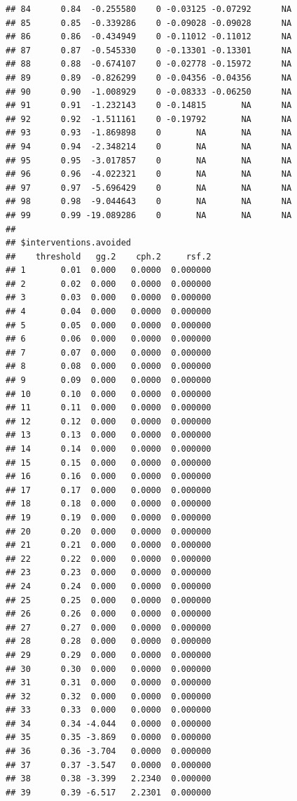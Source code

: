 \documentclass{article}\usepackage[]{graphicx}\usepackage[]{color}
\makeatletter
\newenvironment{kframe}{%
 \def\at@end@of@kframe{}%
 \ifinner\ifhmode%
  \def\at@end@of@kframe{\end{minipage}}%
  \begin{minipage}{\columnwidth}%
 \fi\fi%
 \def\FrameCommand##1{\hskip\@totalleftmargin \hskip-\fboxsep
 \colorbox{shadecolor}{##1}\hskip-\fboxsep
     \hskip-\linewidth \hskip-\@totalleftmargin \hskip\columnwidth}%
 \MakeFramed {\advance\hsize-\width
   \@totalleftmargin\z@ \linewidth\hsize
   \@setminipage}}%
 {\par\unskip\endMakeFramed%
 \at@end@of@kframe}
\newenvironment{knitrout}{}{} %
\makeatother
\begin{document}
\begin{knitrout}
\begin{kframe}
\begin{verbatim}
## 84      0.84  -0.255580    0 -0.03125 -0.07292      NA
## 85      0.85  -0.339286    0 -0.09028 -0.09028      NA
## 86      0.86  -0.434949    0 -0.11012 -0.11012      NA
## 87      0.87  -0.545330    0 -0.13301 -0.13301      NA
## 88      0.88  -0.674107    0 -0.02778 -0.15972      NA
## 89      0.89  -0.826299    0 -0.04356 -0.04356      NA
## 90      0.90  -1.008929    0 -0.08333 -0.06250      NA
## 91      0.91  -1.232143    0 -0.14815       NA      NA
## 92      0.92  -1.511161    0 -0.19792       NA      NA
## 93      0.93  -1.869898    0       NA       NA      NA
## 94      0.94  -2.348214    0       NA       NA      NA
## 95      0.95  -3.017857    0       NA       NA      NA
## 96      0.96  -4.022321    0       NA       NA      NA
## 97      0.97  -5.696429    0       NA       NA      NA
## 98      0.98  -9.044643    0       NA       NA      NA
## 99      0.99 -19.089286    0       NA       NA      NA
## 
## $interventions.avoided
##    threshold   gg.2    cph.2     rsf.2
## 1       0.01  0.000   0.0000  0.000000
## 2       0.02  0.000   0.0000  0.000000
## 3       0.03  0.000   0.0000  0.000000
## 4       0.04  0.000   0.0000  0.000000
## 5       0.05  0.000   0.0000  0.000000
## 6       0.06  0.000   0.0000  0.000000
## 7       0.07  0.000   0.0000  0.000000
## 8       0.08  0.000   0.0000  0.000000
## 9       0.09  0.000   0.0000  0.000000
## 10      0.10  0.000   0.0000  0.000000
## 11      0.11  0.000   0.0000  0.000000
## 12      0.12  0.000   0.0000  0.000000
## 13      0.13  0.000   0.0000  0.000000
## 14      0.14  0.000   0.0000  0.000000
## 15      0.15  0.000   0.0000  0.000000
## 16      0.16  0.000   0.0000  0.000000
## 17      0.17  0.000   0.0000  0.000000
## 18      0.18  0.000   0.0000  0.000000
## 19      0.19  0.000   0.0000  0.000000
## 20      0.20  0.000   0.0000  0.000000
## 21      0.21  0.000   0.0000  0.000000
## 22      0.22  0.000   0.0000  0.000000
## 23      0.23  0.000   0.0000  0.000000
## 24      0.24  0.000   0.0000  0.000000
## 25      0.25  0.000   0.0000  0.000000
## 26      0.26  0.000   0.0000  0.000000
## 27      0.27  0.000   0.0000  0.000000
## 28      0.28  0.000   0.0000  0.000000
## 29      0.29  0.000   0.0000  0.000000
## 30      0.30  0.000   0.0000  0.000000
## 31      0.31  0.000   0.0000  0.000000
## 32      0.32  0.000   0.0000  0.000000
## 33      0.33  0.000   0.0000  0.000000
## 34      0.34 -4.044   0.0000  0.000000
## 35      0.35 -3.869   0.0000  0.000000
## 36      0.36 -3.704   0.0000  0.000000
## 37      0.37 -3.547   0.0000  0.000000
## 38      0.38 -3.399   2.2340  0.000000
## 39      0.39 -6.517   2.2301  0.000000

\end{verbatim}
\end{kframe}
\end{knitrout}
\end{document}
